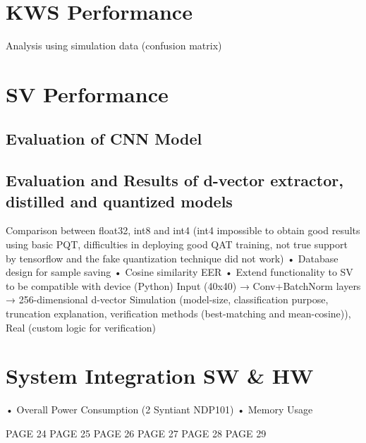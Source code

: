                                                                         \section{KWS Performance}
\label{sec:kws performance}
Analysis using simulation data (confusion matrix)\newline 

\section{SV Performance}
\label{sec:sv performance}
\subsection{Evaluation of CNN Model}

\subsection{Evaluation and Results of d-vector extractor, distilled and quantized models}
Comparison between float32, int8 and int4 (int4 impossible to obtain good results using basic PQT, difficulties in deploying good QAT training, not true support by tensorflow and the fake quantization technique did not work)\newline 
• Database design for sample saving \newline
• Cosine similarity EER \newline
• Extend functionality to SV to be compatible with device (Python)\newline
Input (40x40) → Conv+BatchNorm layers → 256-dimensional d-vector \newline
Simulation (model-size, classification purpose, truncation explanation, verification methods (best-matching and mean-cosine)), Real (custom logic for verification)\newline

\section{System Integration SW \& HW}
\label{sec: system integration}
• Overall Power Consumption (2 Syntiant NDP101)\newline
• Memory Usage\newline\newline

PAGE 24
\newpage
PAGE 25
\newpage
PAGE 26
\newpage
PAGE 27
\newpage
PAGE 28
\newpage
PAGE 29
\newpage